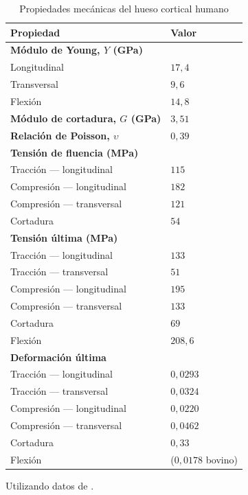 \documentclass[12pt]{book}
\begin{document}
\begin{table}[htbp]
\centering
\caption{Propiedades mecánicas del hueso cortical humano}
\label{tab:43}
\begin{tabularx}{0.8\textwidth}{Xl}
\toprule
\textbf{Propiedad} & \textbf{Valor} \\
\midrule
\textbf{Módulo de Young, $Y$ (GPa)} & \\
\quad Longitudinal & $17,4$ \\
\quad Transversal & $9,6$ \\
\quad Flexión & $14,8$ \\
\midrule
\textbf{Módulo de cortadura, $G$ (GPa)} & $3,51$ \\
\midrule
\textbf{Relación de Poisson, $\upsilon$} & $0,39$ \\
\midrule
\textbf{Tensión de fluencia (MPa)} & \\
\quad Tracción --- longitudinal & $115$ \\
\quad Compresión --- longitudinal & $182$ \\
\quad Compresión --- transversal & $121$ \\
\quad Cortadura & $54$ \\
\midrule
\textbf{Tensión última (MPa)} & \\
\quad Tracción --- longitudinal & $133$ \\
\quad Tracción --- transversal & $51$ \\
\quad Compresión --- longitudinal & $195$ \\
\quad Compresión --- transversal & $133$ \\
\quad Cortadura & $69$ \\
\quad Flexión & $208,6$ \\
\midrule
\textbf{Deformación última} & \\
\quad Tracción --- longitudinal & $0,0293$ \\
\quad Tracción --- transversal & $0,0324$ \\
\quad Compresión --- longitudinal & $0,0220$ \\
\quad Compresión --- transversal & $0,0462$ \\
\quad Cortadura & $0,33$ \\
\quad Flexión & ($0,0178$ bovino) \\
\bottomrule
\end{tabularx}
\begin{flushleft}
    \small Utilizando datos de \cite{45}.
\end{flushleft}
\end{table}
\end{document}
